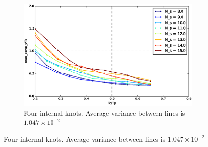 \begin{figure}[!h]
        \centering
        ~ %
        \begin{subfigure}[b]{0.48\textwidth}
                \includegraphics[width=\textwidth]{./img/realtime/Scenario_3__N_knots_4/mcttc-tctp.eps}
                \caption{Four internal knots. Average variance between lines is $1.047\times 10^{-2}$}\label{fig:uni34}
        \end{subfigure}
        

\end{figure}
